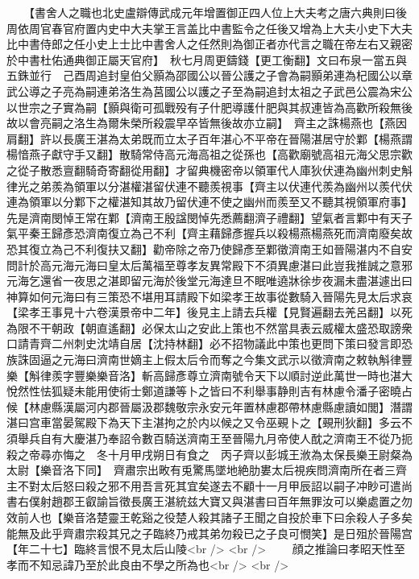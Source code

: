 　　【書舍人之職也北史盧辯傳武成元年增置御正四人位上大夫考之唐六典則曰後周依周官春官府置内史中大夫掌王言盖比中書監令之任後又增為上大夫小史下大夫比中書侍郎之任小史上士比中書舍人之任然則為御正者亦代言之職在帝左右又親密於中書杜佑通典御正屬天官府】　秋七月周更鑄錢【更工衡翻】文曰布泉一當五與五銖並行　己酉周追封皇伯父顥為邵國公以晉公護之子會為嗣顥弟連為杞國公以章武公導之子亮為嗣連弟洛生為莒國公以護之子至為嗣追封太祖之子武邑公震為宋公以世宗之子實為嗣【顥與衛可孤戰殁有子什肥導護什肥與其叔連皆為高歡所殺無後故以會亮嗣之洛生為爾朱榮所殺震早卒皆無後故亦立嗣】　齊主之誅楊燕也【燕因肩翻】許以長廣王湛為太弟既而立太子百年湛心不平帝在晉陽湛居守於鄴【楊燕謂楊愔燕子獻守手又翻】散騎常侍高元海高祖之從孫也【高歡廟號高祖元海父思宗歡之從子散悉亶翻騎奇寄翻從用翻】才留典機密帝以領軍代人庫狄伏連為幽州刺史斛律光之弟羨為領軍以分湛權湛留伏連不聽羨視事【齊主以伏連代羨為幽州以羨代伏連為領軍以分鄴下之權湛知其故乃留伏連不使之幽州而羨至又不聽其視領軍府事】先是濟南閔悼王常在鄴【濟南王殷諡閔悼先悉薦翻濟子禮翻】望氣者言鄴中有天子氣平秦王歸彥恐濟南復立為己不利【齊主藉歸彥握兵以殺楊燕楊燕死而濟南廢矣故恐其復立為己不利復扶又翻】勸帝除之帝乃使歸彥至鄴徵濟南王如晉陽湛内不自安問計於高元海元海曰皇太后萬福至尊孝友異常殿下不須異慮湛曰此豈我推誠之意邪元海乞還省一夜思之湛即留元海於後堂元海達旦不眠唯遶牀徐步夜漏未盡湛遽出曰神算如何元海曰有三策恐不堪用耳請殿下如梁孝王故事從數騎入晉陽先見太后求哀【梁孝王事見十六卷漢景帝中二年】後見主上請去兵權【見賢遍翻去羌呂翻】以死為限不干朝政【朝直遙翻】必保太山之安此上策也不然當具表云威權太盛恐取謗衆口請青齊二州刺史沈靖自居【沈持林翻】必不招物議此中策也更問下策曰發言即恐族誅固逼之元海曰濟南世嫡主上假太后令而奪之今集文武示以徵濟南之敕執斛律豐樂【斛律羨字豐樂樂音洛】斬高歸彥尊立濟南號令天下以順討逆此萬世一時也湛大悅然性怯狐疑未能用使術士鄭道謙等卜之皆曰不利舉事静則吉有林慮令潘子密曉占候【林慮縣漢屬河内郡晉屬汲郡魏敬宗永安元年置林慮郡帶林慮縣慮讀如閭】潛謂湛曰宫車當晏駕殿下為天下主湛拘之於内以候之又令巫覡卜之【覡刑狄翻】多云不須舉兵自有大慶湛乃奉詔令數百騎送濟南王至晉陽九月帝使人酖之濟南王不從乃扼殺之帝尋亦悔之　冬十月甲戌朔日有食之　丙子齊以彭城王浟為太保長樂王尉粲為太尉【樂音洛下同】　齊肅宗出畋有兎驚馬墜地絶肋婁太后視疾問濟南所在者三齊主不對太后怒曰殺之邪不用吾言死其宜矣遂去不顧十一月甲辰詔以嗣子冲眇可遣尚書右僕射趙郡王叡諭旨徵長廣王湛統兹大寶又與湛書曰百年無罪汝可以樂處置之勿效前人也【樂音洛楚靈王乾谿之役楚人殺其諸子王聞之自投於車下曰余殺人子多矣能無及此乎齊肅宗殺其兄之子臨終乃戒其弟勿殺已之子良可憫笑】是日殂於晉陽宫【年二十七】臨終言恨不見太后山陵<br />
<br />
　　顔之推論曰孝昭天性至孝而不知忌諱乃至於此良由不學之所為也<br />
<br />
